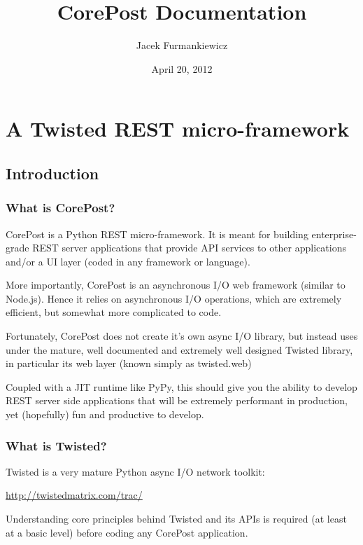 \documentclass[letterpaper,10pt,english]{sphinxmanual}
\title{CorePost Documentation}
\date{April 20, 2012}
\author{Jacek Furmankiewicz}
\begin{document}
\maketitle
\tableofcontents
{}\label{index::doc}



\chapter{A Twisted REST micro-framework}
\label{index:a-twisted-rest-micro-framework}\label{index:corepost}

\section{Introduction}
\label{intro:introduction}\label{intro::doc}

\subsection{What is CorePost?}
\label{intro:what-is-corepost}
CorePost is a Python REST micro-framework. It is meant for building enterprise-grade REST server applications that provide
API services to other applications and/or a UI layer (coded in any framework or language).

More importantly, CorePost is an asynchronous I/O web framework (similar to Node.js).
Hence it relies on asynchronous I/O operations, which are extremely efficient, but somewhat more complicated to code.

Fortunately, CorePost does not create it's own async I/O library, but instead uses under the mature, well documented
and extremely well designed Twisted library, in particular its web layer (known simply as twisted.web)

Coupled with a JIT runtime like PyPy, this should give you the ability to develop REST server side applications
that will be extremely performant in production, yet (hopefully) fun and productive to develop.


\subsection{What is Twisted?}
\label{intro:what-is-twisted}
Twisted is a very mature Python async I/O network toolkit:

\href{http://twistedmatrix.com/trac/}{http://twistedmatrix.com/trac/}

Understanding core principles behind Twisted and its APIs is required (at least at a basic level) before coding any CorePost application.
\end{document}
